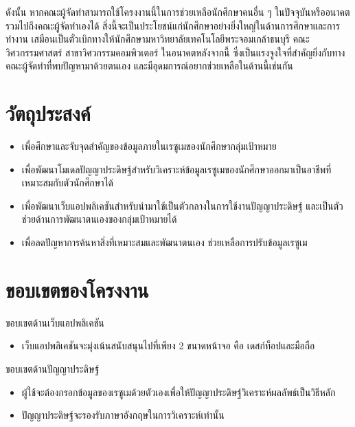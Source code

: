 ดังนั้น  หากคณะผู้จัดทำสามารถใช้โครงงานนี้ในการช่วยเหลือนักศึกษาคนอื่น ๆ ในปัจจุบันหรืออนาคต รวมไปถึงคณะผู้จัดทำเองได้ สิ่งนี้จะเป็นประโยชน์แก่นักศึกษาอย่างยิ่งใหญ่ในด้านการศึกษาและการทำงาน เสมือนเป็นตั๋วเบิกทางให้นักศึกษามหาวิทยาลัยเทคโนโลยีพระจอมเกล้าธนบุรี คณะวิศวกรรมศาสตร์ สาขาวิศวกรรมคอมพิวเตอร์ ในอนาคตหลังจากนี้ ซึ่งเป็นแรงจูงใจที่สำคัญยิ่งกับทางคณะผู้จัดทำที่พบปัญหามาด้วยตนเอง และมีอุดมการณ์อยากช่วยเหลือในด้านนี้เช่นกัน


\section{วัตถุประสงค์}

\begin{itemize}
    \item  เพื่อศึกษาและจับจุดสำคัญของข้อมูลภายในเรซูเมของนักศึกษากลุ่มเป้าหมาย
    \item  เพื่อพัฒนาโมเดลปัญญาประดิษฐ์สำหรับวิเคราะห์ข้อมูลเรซูเมของนักศึกษาออกมาเป็นอาชีพที่เหมาะสมกับตัวนักศึกษาได้
    \item  เพื่อพัฒนาเว็บแอปพลิเคชันสำหรับนำมาใช้เป็นตัวกลางในการใช้งานปัญญาประดิษฐ์ และเป็นตัวช่วยด้านการพัฒนาตนเองของกลุ่มเป้าหมายได้
    \item  เพื่อลดปัญหาการค้นหาสิ่งที่เหมาะสมและพัฒนาตนเอง ช่วยเหลือการปรับข้อมูลเรซูเม
\end{itemize}


\section{ขอบเขตของโครงงาน}

ขอบเขตด้านเว็บแอปพลิเคชัน
\begin{itemize}
    \item  เว็บแอปพลิเคชันจะมุ่งเน้นสนับสนุนไปที่เพียง 2 ขนาดหน้าจอ คือ เดสก์ท็อปและมือถือ
\end{itemize}

ขอบเขตด้านปัญญาประดิษฐ์
\begin{itemize}
    \item  ผู้ใช้จะต้องกรอกข้อมูลของเรซูเมด้วยตัวเองเพื่อให้ปัญญาประดิษฐ์วิเคราะห์ผลลัพธ์เป็นวิธีหลัก
    \item  ปัญญาประดิษฐ์จะรองรับภาษาอังกฤษในการวิเคราะห์เท่านั้น
\end{itemize}

